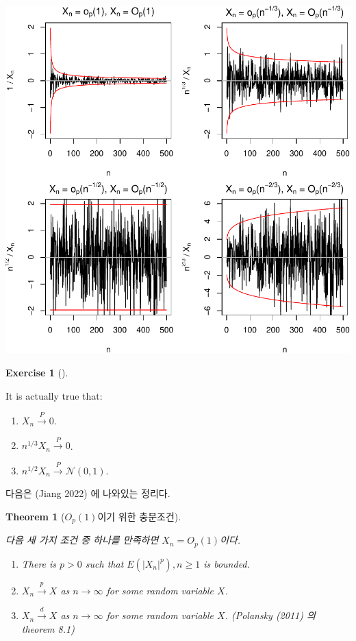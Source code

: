 \documentclass[
  13pt,
  letterpaper,
  DIV=11,
  numbers=noendperiod]{scrreprt}
\theoremstyle{definition}
\theoremstyle{plain}
\theoremstyle{definition}
\newtheorem{exercise}{Exercise}[chapter]
\theoremstyle{plain}
\newtheorem{theorem}{Theorem}[chapter]
\theoremstyle{plain}
\theoremstyle{definition}
\theoremstyle{remark}
\begin{document}
\begin{center}
\includegraphics{bigoh_files/figure-pdf/unnamed-chunk-2-1.pdf}
\end{center}

\begin{exercise}[]\protect\hypertarget{exr-probconvexr}{}\label{exr-probconvexr}

It is actually true that:

\begin{enumerate}
\def\labelenumi{\arabic{enumi}.}
\item
  \(X_n \stackrel{P}{\rightarrow}0\).
\item
  \(n^{1/3}X_n \stackrel{P}{\rightarrow} 0\).
\item
  \(n^{1/2}X_n \stackrel{P}{\rightarrow} \mathcal{N}(0,1)\).
\end{enumerate}

\end{exercise}

다음은 (Jiang 2022) 에 나와있는 정리다.

\begin{theorem}[\(O_p(1)\)이기 위한
충분조건]\protect\hypertarget{thm-suffbigop}{}\label{thm-suffbigop}

다음 세 가지 조건 중 하나를 만족하면 \(X_n = O_p(1)\)이다.

\begin{enumerate}
\def\labelenumi{\arabic{enumi}.}
\item
  There is \(p>0\) such that \(E(|X_n|^p), n\geq 1\) is bounded.
\item
  \(X_n\stackrel{p}{\rightarrow}X\) as \(n\rightarrow\infty\) for some
  random variable \(X\).
\item
  \(X_n \stackrel{d}{\rightarrow}X\) as \(n\rightarrow\infty\) for some
  random variable \(X\). (Polansky (2011) 의 theorem 8.1)
\end{enumerate}

\end{theorem}
\end{document}
